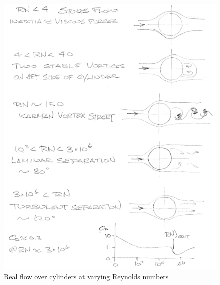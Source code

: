 \documentclass[draft=false, titlepage]{article}
\begin{document}
\begin{figure}[ht]
    \centering
    \includegraphics[width=0.7\linewidth]{Figures/realFlowOverCylinders.PNG}
    \caption{Real flow over cylinders at varying Reynolds numbers}
    \label{fig:RealFlowOverCylinders}
\end{figure}

\end{document}
